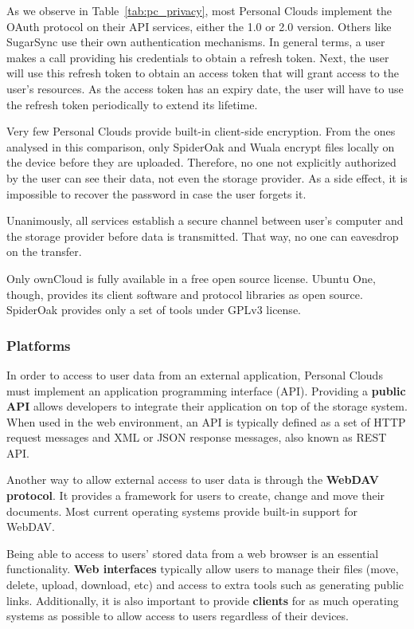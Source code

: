 As we observe in Table~\ref{tab:pc_privacy}, most Personal Clouds implement the OAuth protocol on their API services, either the 1.0 or 2.0 version. Others like SugarSync use their own authentication mechanisms. In general terms, a user makes a call providing his credentials to obtain a refresh token. Next, the user will use this refresh token to obtain an access token that will grant access to the user's resources. As the access token has an expiry date, the user will have to use the refresh token periodically to extend its lifetime.

Very few Personal Clouds provide built-in client-side encryption. From the ones analysed in this comparison, only SpiderOak and Wuala encrypt files locally on the device before they are uploaded. Therefore, no one not explicitly authorized by the user can see their data, not even the storage provider. As a side effect, it is impossible to recover the password in case the user forgets it.

Unanimously, all services establish a secure channel between user's computer and the storage provider before data is transmitted. That way, no one can eavesdrop on the transfer.

Only ownCloud is fully available in a free open source license. Ubuntu One, though, provides its client software and protocol libraries as open source. SpiderOak provides only a set of tools under GPLv3 license.



\subsubsection{Platforms}


In order to access to user data from an external application, Personal Clouds must implement an application programming interface (API). Providing a \textbf{public API} allows developers to integrate their application on top of the storage system. When used in the web environment, an API is typically defined as a set of HTTP request messages and XML or JSON response messages, also known as REST API.

Another way to allow external access to user data is through the \textbf{WebDAV protocol}. It provides a framework for users to create, change and move their documents. Most current operating systems provide built-in support for WebDAV.

Being able to access to users' stored data from a web browser is an essential functionality. \textbf{Web interfaces} typically allow users to manage their files (move, delete, upload, download, etc) and access to extra tools such as generating public links. Additionally, it is also important to provide \textbf{clients} for as much operating systems as possible to allow access to users regardless of their devices.


